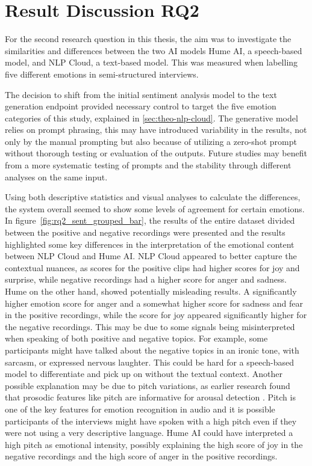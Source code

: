 
\section{Result Discussion RQ2}
\label{subsec:RQ2interpretation}
For the second research question in this thesis, the aim was to investigate the similarities and differences between the two AI models Hume AI, a speech-based model, and NLP Cloud, a text-based model. This was measured when labelling five different emotions in semi-structured interviews.

The decision to shift from the initial sentiment analysis model to the text generation endpoint provided necessary control to target the five emotion categories of this study, explained in \ref{sec:theo-nlp-cloud}. The generative model relies on prompt phrasing, this may have introduced variability in the results, not only by the manual prompting but also because of utilizing a zero-shot prompt without thorough testing or evaluation of the outputs. Future studies may benefit from a more systematic testing of prompts and the stability through different analyses on the same input. 

\medskip
Using both descriptive statistics and visual analyses to calculate the differences, the system overall seemed to show some levels of agreement for certain emotions.
In figure~\ref{fig:rq2_sent_grouped_bar}, the results of the entire dataset divided between the positive and negative recordings were presented and the results highlighted some key differences in the interpretation of the emotional content between NLP Cloud and Hume AI. NLP Cloud appeared to better capture the contextual nuances, as scores for the positive clips had higher scores for joy and surprise, while negative recordings had a higher score for anger and sadness. 
Hume on the other hand, showed potentially misleading results. A significantly higher emotion score for anger and a somewhat higher score for sadness and fear in the positive recordings, while the score for joy appeared significantly higher for the negative recordings. This may be due to some signals being misinterpreted when speaking of both positive and negative topics. For example, some participants might have talked about the negative topics in an ironic tone, with sarcasm, or expressed nervous laughter. This could be hard for a speech-based model to differentiate and pick up on without the textual context.
Another possible explanation may be due to pitch variations, as earlier research found that prosodic features like pitch are informative for arousal detection \autocite{Soleymani2017}. Pitch is one of the key features for emotion recognition in audio and it is possible participants of the interviews might have spoken with a high pitch even if they were not using a very descriptive language. Hume AI could have interpreted a high pitch as emotional intensity, possibly explaining the high score of joy in the negative recordings and the high score of anger in the positive recordings.

